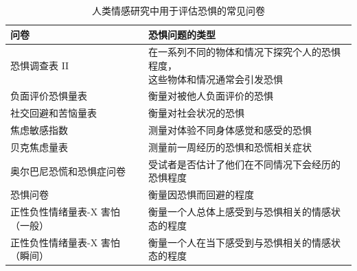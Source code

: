 \begin{table}[htbp]
	\caption{人类情感研究中用于评估恐惧的常见问卷} \label{tab:42_1} \centering
	\begin{tabular}{ll}
		\toprule
		问卷 & 恐惧问题的类型 \\
		\midrule
		恐惧调查表 II & \makecell[l]{在一系列不同的物体和情况下探究个人的恐惧程度，\\这些物体和情况通常会引发恐惧} \\
		负面评价恐惧量表 & 衡量对被他人负面评价的恐惧 \\
		社交回避和苦恼量表 & 衡量对社会状况的恐惧 \\
		焦虑敏感指数 & 测量对体验不同身体感觉和感受的恐惧 \\
		贝克焦虑量表 & 测量前一周经历的恐惧和恐慌相关症状 \\
		奥尔巴尼恐慌和恐惧症问卷 & 受试者是否估计了他们在不同情况下会经历的恐惧程度 \\
		恐惧问卷 & 衡量因恐惧而回避的程度 \\
		正性负性情绪量表-X 害怕（一般） & 衡量一个人总体上感受到与恐惧相关的情感状态的程度 \\
		正性负性情绪量表-X 害怕（瞬间） & 衡量一个人在当下感受到与恐惧相关的情感状态的程度 \\
		\bottomrule
	\end{tabular}
\end{table}


